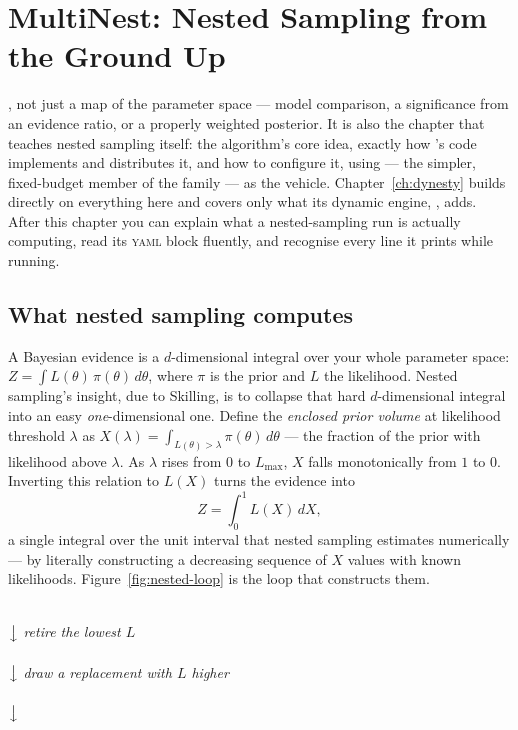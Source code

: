 \chapter{MultiNest: Nested Sampling from the Ground Up}
\label{ch:multinest}

, not just a map
of the parameter space --- model comparison, a significance from an evidence ratio, or
a properly weighted posterior. It is also the chapter that teaches nested sampling
itself: the algorithm's core idea, exactly how \Jtwo's code implements and distributes
it, and how to configure it, using  --- the simpler, fixed-budget
member of the family --- as the vehicle. Chapter~\ref{ch:dynesty} builds directly on
everything here and covers only what its dynamic engine, , adds.
After this chapter you can explain what a nested-sampling run is actually computing,
read its \textsc{yaml} block fluently, and recognise every line it prints while
running.

\section{What nested sampling computes}
\label{sec:nested-what}

A Bayesian evidence is a $d$-dimensional integral over your whole parameter space:
$Z = \int L(\theta)\,\pi(\theta)\,d\theta$, where $\pi$ is the prior and $L$ the
likelihood. Nested sampling's insight, due to Skilling\cite{Skilling:2006gxv}, is to
collapse that hard $d$-dimensional integral into an easy \emph{one}-dimensional one.
Define the \emph{enclosed prior volume} at likelihood threshold $\lambda$ as
$X(\lambda) = \int_{L(\theta) > \lambda} \pi(\theta)\,d\theta$ --- the fraction of the
prior with likelihood above $\lambda$. As $\lambda$ rises from $0$ to $L_{\max}$, $X$
falls monotonically from $1$ to $0$. Inverting this relation to $L(X)$ turns the
evidence into
\[
Z = \int_0^1 L(X)\,dX,
\]
a single integral over the unit interval that nested sampling estimates numerically ---
by literally constructing a decreasing sequence of $X$ values with known likelihoods.
Figure~\ref{fig:nested-loop} is the loop that constructs them.

\begin{marginfigure}
\centering
{}\\[2pt]
$\big\downarrow$ \emph{retire the lowest $L$}\\[2pt]
\\[2pt]
$\big\downarrow$ \emph{draw a replacement with $L$ higher}\\[2pt]
\\[2pt]
$\big\downarrow$\\[2pt]
\caption{The nested-sampling loop. Every retired point is a slice of shrinking prior
volume at a known likelihood --- exactly the data $Z=\int_0^1 L(X)\,dX$ needs.}
\label{fig:nested-loop}
\end{marginfigure}

